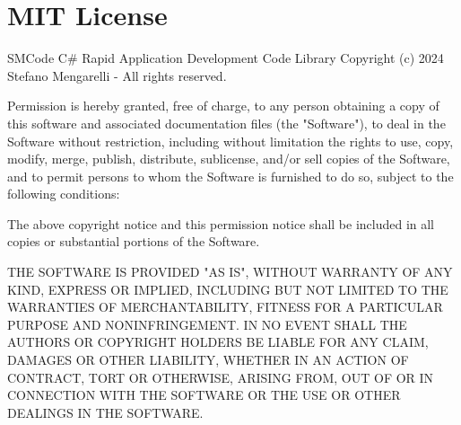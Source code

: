 \chapter{MIT License}
\label{md__m_1_2_r_e_p_o_s_i_t_o_r_y_2_v_s2022_2_s_m_code_2_s_m_code_2bin_2_release_2net47_2_l_i_c_e_n_s_e}
SMCode C\# Rapid Application Development Code Library Copyright (c) 2024 Stefano Mengarelli -\/ All rights reserved.

Permission is hereby granted, free of charge, to any person obtaining a copy of this software and associated documentation files (the "{}\+Software"{}), to deal in the Software without restriction, including without limitation the rights to use, copy, modify, merge, publish, distribute, sublicense, and/or sell copies of the Software, and to permit persons to whom the Software is furnished to do so, subject to the following conditions\+:

The above copyright notice and this permission notice shall be included in all copies or substantial portions of the Software.

THE SOFTWARE IS PROVIDED "{}\+AS IS"{}, WITHOUT WARRANTY OF ANY KIND, EXPRESS OR IMPLIED, INCLUDING BUT NOT LIMITED TO THE WARRANTIES OF MERCHANTABILITY, FITNESS FOR A PARTICULAR PURPOSE AND NONINFRINGEMENT. IN NO EVENT SHALL THE AUTHORS OR COPYRIGHT HOLDERS BE LIABLE FOR ANY CLAIM, DAMAGES OR OTHER LIABILITY, WHETHER IN AN ACTION OF CONTRACT, TORT OR OTHERWISE, ARISING FROM, OUT OF OR IN CONNECTION WITH THE SOFTWARE OR THE USE OR OTHER DEALINGS IN THE SOFTWARE. 